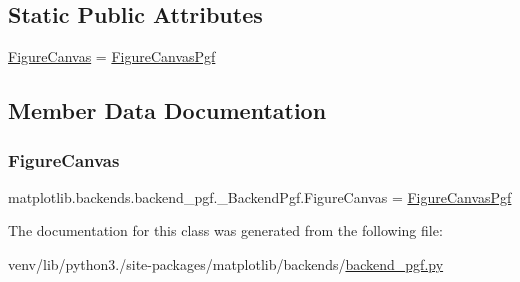 \subsection*{Static Public Attributes}
\begin{DoxyCompactItemize}
\item 
\hyperlink{classmatplotlib_1_1backends_1_1backend__pgf_1_1__BackendPgf_a12a83990f53d047758272fc3f96e86b1}{Figure\+Canvas} = \hyperlink{classmatplotlib_1_1backends_1_1backend__pgf_1_1FigureCanvasPgf}{Figure\+Canvas\+Pgf}
\end{DoxyCompactItemize}


\subsection{Member Data Documentation}
\mbox{\label{classmatplotlib_1_1backends_1_1backend__pgf_1_1__BackendPgf_a12a83990f53d047758272fc3f96e86b1}} 
\subsubsection{\texorpdfstring{Figure\+Canvas}{FigureCanvas}}
{\footnotesize\ttfamily matplotlib.\+backends.\+backend\+\_\+pgf.\+\_\+\+Backend\+Pgf.\+Figure\+Canvas = \hyperlink{classmatplotlib_1_1backends_1_1backend__pgf_1_1FigureCanvasPgf}{Figure\+Canvas\+Pgf}\hspace{0.3cm}{\ttfamily [static]}}



The documentation for this class was generated from the following file\+:\begin{DoxyCompactItemize}
\item 
venv/lib/python3./site-\/packages/matplotlib/backends/\hyperlink{backend__pgf_8py}{backend\+\_\+pgf.\+py}\end{DoxyCompactItemize}
